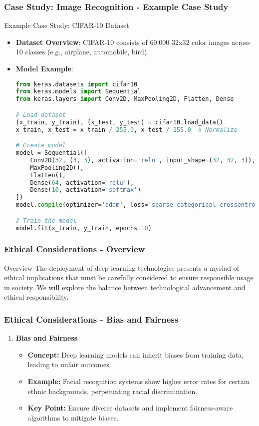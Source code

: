 \documentclass[aspectratio=169]{beamer}
\begin{document}
\begin{frame}[fragile]
    \frametitle{Case Study: Image Recognition - Example Case Study}
    \begin{block}{Example Case Study: CIFAR-10 Dataset}
        \begin{itemize}
            \item \textbf{Dataset Overview}: CIFAR-10 consists of 60,000 32x32 color images across 10 classes (e.g., airplane, automobile, bird).
            \item \textbf{Model Example}:
            \begin{lstlisting}[language=python]
from keras.datasets import cifar10
from keras.models import Sequential
from keras.layers import Conv2D, MaxPooling2D, Flatten, Dense

# Load dataset
(x_train, y_train), (x_test, y_test) = cifar10.load_data()
x_train, x_test = x_train / 255.0, x_test / 255.0  # Normalize

# Create model
model = Sequential([
    Conv2D(32, (3, 3), activation='relu', input_shape=(32, 32, 3)),
    MaxPooling2D(),
    Flatten(),
    Dense(64, activation='relu'),
    Dense(10, activation='softmax')
])
model.compile(optimizer='adam', loss='sparse_categorical_crossentropy', metrics=['accuracy'])

# Train the model
model.fit(x_train, y_train, epochs=10)
            \end{lstlisting}
        \end{itemize}
    \end{block}
\end{frame}

\begin{frame}[fragile]
    \frametitle{Ethical Considerations - Overview}
    \begin{block}{Overview}
        The deployment of deep learning technologies presents a myriad of ethical implications that must be carefully considered to ensure responsible usage in society. 
        We will explore the balance between technological advancement and ethical responsibility.
    \end{block}
\end{frame}

\begin{frame}[fragile]
    \frametitle{Ethical Considerations - Bias and Fairness}
    \begin{enumerate}
        \item \textbf{Bias and Fairness}
        \begin{itemize}
            \item \textbf{Concept:} Deep learning models can inherit biases from training data, leading to unfair outcomes.
            \item \textbf{Example:} Facial recognition systems show higher error rates for certain ethnic backgrounds, perpetuating racial discrimination.
            \item \textbf{Key Point:} Ensure diverse datasets and implement fairness-aware algorithms to mitigate biases.
        \end{itemize}
    \end{enumerate}
\end{frame}
\end{document}
